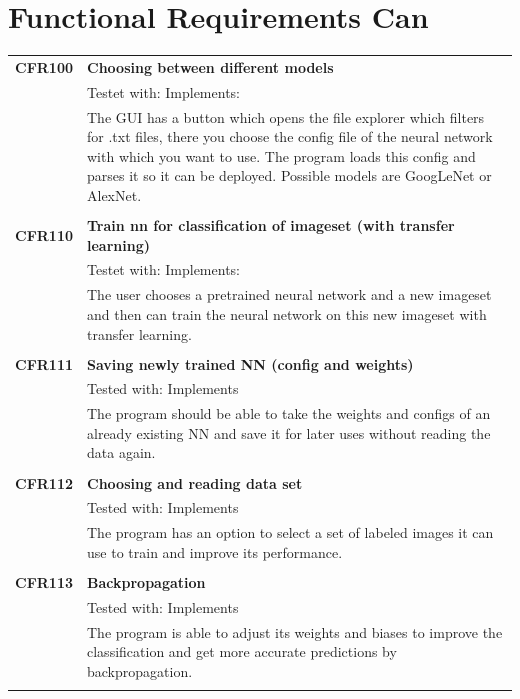 \documentclass[parskip=full]{scrartcl}
\begin{document}
\section{Functional Requirements Can}
\begin{tabular}{p{2cm}p{12cm}}
\textbf{CFR100} & \textbf{Choosing between different models}\\
& Testet with: Implements: \\
& The GUI has a button which opens the file explorer which filters for .txt files, there you choose the config file of the neural network with which you want to use. The program loads this config and parses it so it can be deployed. Possible models are GoogLeNet or AlexNet.\\
& \\
\textbf{CFR110} & \textbf{Train nn for classification of imageset (with transfer learning)}\\
& Testet with: Implements: \\
& The user chooses a pretrained neural network and a new imageset and then can train the neural network on this new imageset with transfer learning.\\
& \\
\textbf {CFR111} & \textbf{Saving newly trained NN (config and weights)} \\
& Tested with: Implements\\
& The program should be able to take the weights and configs of an already existing NN and save it for later uses without reading the data again. \\
& \\
\textbf {CFR112} & \textbf{Choosing and reading data set} \\
& Tested with: Implements\\
& The program has an option to select a set of labeled images it can use to train and improve its performance. \\
& \\
\textbf {CFR113} & \textbf{Backpropagation} \\
& Tested with: Implements\\
& The program is able to adjust its weights and biases to improve the classification and get more accurate predictions by backpropagation.\\
& \\
\end{tabular}
\newpage
\end{document}
